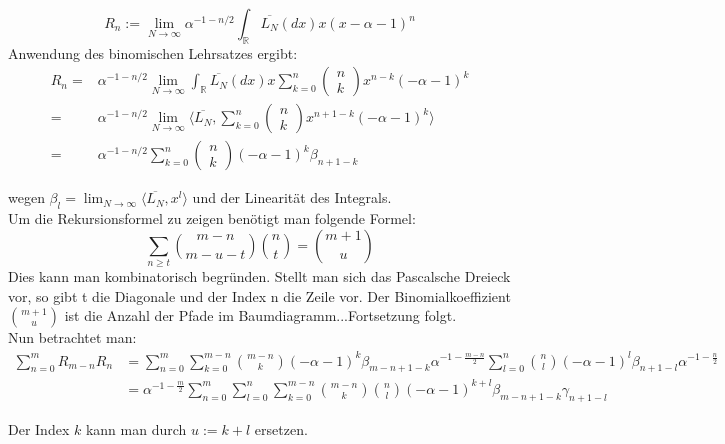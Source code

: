 \documentclass[a4paper, 11pt]{scrreprt}
\newcommand{\RR}{\mathbb{R}}
\begin{document}
\begin{equation}
R_n:=\lim_{N \to \infty} \alpha^{-1-n/2} \int_{\RR}\overline{L_{N}}(dx)x(x-\alpha-1)^{n} 
\end{equation}
Anwendung des binomischen Lehrsatzes ergibt:
\begin{align*}
 R_n =& \alpha^{-1-n/2} \lim_{N \to \infty} \int_{\RR}\overline{L_{N}}(dx)x \sum_{k=0}^n \begin{pmatrix} n\\k\end{pmatrix} x^{n-k}(-\alpha -1)^k \\
 =& \alpha^{-1-n/2} \lim_{N \to \infty} \langle \overline{L_{N}}, \sum_{k=0}^n \begin{pmatrix} n\\k\end{pmatrix} x^{n+1-k}(-\alpha -1)^k \rangle \\
 =& \alpha^{-1-n/2}\sum_{k=0}^n \begin{pmatrix} n\\k\end{pmatrix} (-\alpha -1)^k \beta_{n+1-k}
\end{align*}

wegen $\beta_l = \lim_{N\to\infty} \langle \overline{L_N}, x^l \rangle$ und der Linearität des Integrals.\\

Um die Rekursionsformel zu zeigen benötigt man folgende Formel:
\begin{equation}
	\sum_{n \geq t} \binom{m-n}{m-u-t} \binom{n}{t} = \binom{m+1}{u}
\end{equation}
Dies kann man kombinatorisch begründen. Stellt man sich das Pascalsche Dreieck vor, so gibt t die Diagonale und der Index n die Zeile vor. Der Binomialkoeffizient \(\binom{m+1}{u}\) ist die Anzahl der Pfade im Baumdiagramm...Fortsetzung folgt. \\

Nun betrachtet man:
\begin{align*}
\sum_{n=0}^m R_{m-n} R_n 
&= \sum_{n=0}^m \sum_{k=0}^{m-n} \binom{m-n}{k} (-\alpha -1)^k \beta_{m-n+1-k} \alpha^{-1-\frac{m-n}{2}} \sum_{l=0}^n \binom{n}{l} (-\alpha -1)^l \beta_{n+1-l} \alpha^{-1-\frac{n}{2}} \\
&= \alpha^{-1-\frac{m}{2}} \sum_{n=0}^m \sum_{l=0}^n \sum_{k=0}^{m-n} \binom{m-n}{k}  \binom{n}{l} (-\alpha -1)^{k+l} \beta_{m-n+1-k} \gamma_{n+1-l}	
\end{align*}

Der Index $k$ kann man durch $u:=k+l$ ersetzen.
\end{document}
